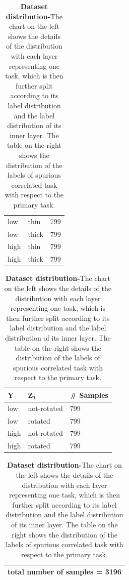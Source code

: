 \documentclass[12pt,DIV14,BCOR12mm,a4paper,footinclude=false,headinclude,parskip=half-,twoside,openright,cleardoublepage=empty,toc=index,bibliography=totoc,listof=totoc]{scrreprt}
\numberwithin{equation}{chapter}
\begin{document}
\begin{table}[H]
\begin{minipage}[H]{\linewidth}
\begin{minipage}[H]{0.5\linewidth}
\begin{tabular}{|p{1cm}|p{2cm}|p{2cm}|}
                \hline
                low & thin & 799 \\
                low & thick & 799\\
                high & thin & 799 \\
                high & thick & 799\\
                \hline
            \end{tabular}
            \begin{tabular}{|p{1cm}|p{2cm}|p{2cm}|}
                \hline
                $\mathbf{Y}$ & $\mathbf{Z_1}$ & \# \textbf{Samples } \\
                \hline
                low & not-rotated & 799 \\
                low & rotated & 799\\
                high & not-rotated & 799 \\
                high & rotated & 799\\
                \hline
            \end{tabular}
            \begin{tabular}{|p{5.88cm}|}
                 \hline
                 total number of samples = 3196\\
                 \hline
            \end{tabular}
        \end{minipage}%
        \caption{Morpho-MNIST balanced-test distribution} 
        \label{tab:balanced-testMMNIST}
        \caption*{\textbf{Dataset distribution-}The chart on the left shows the details of the distribution with each layer representing one task, which is then further split according to its label distribution and the label distribution of its inner layer. The table on the right shows the distribution of the labels of spurious correlated task with respect to the primary task.}
    \end{minipage}%
\end{table}
\end{document}
